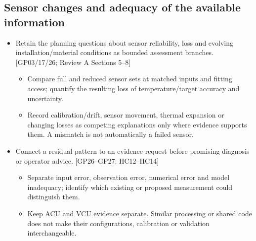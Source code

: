 \subsection{Sensor changes and adequacy of the available information}
\begin{itemize}[leftmargin=*]
\item Retain the planning questions about sensor reliability, loss and evolving installation/material conditions as bounded assessment branches. [GP03/17/26; Review A Sections 5--8]
\begin{itemize}
\item Compare full and reduced sensor sets at matched inputs and fitting access; quantify the resulting loss of temperature/target accuracy and uncertainty.
\item Record calibration/drift, sensor movement, thermal expansion or changing losses as competing explanations only where evidence supports them. A mismatch is not automatically a failed sensor.
\end{itemize}
\item Connect a residual pattern to an evidence request before promising diagnosis or operator advice. [GP26--GP27; HC12--HC14]
\begin{itemize}
\item Separate input error, observation error, numerical error and model inadequacy; identify which existing or proposed measurement could distinguish them.
\item Keep ACU and VCU evidence separate. Similar processing or shared code does not make their configurations, calibration or validation interchangeable.
\end{itemize}
\end{itemize}
